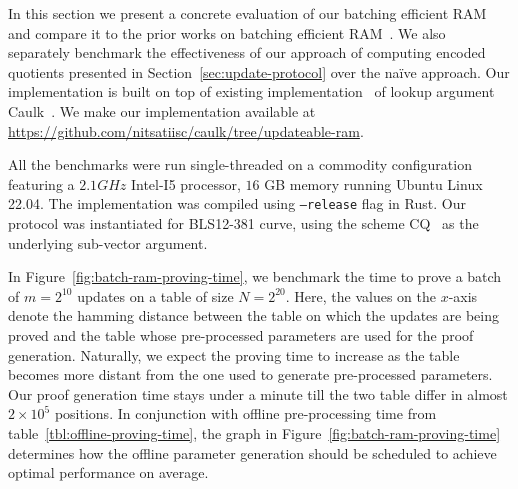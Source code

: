 In this section we present a concrete evaluation of our batching efficient RAM and compare it to the
prior works on batching efficient RAM~\cite{USENIX:OWWB20,CCS:CFHKKO22}.
We also separately benchmark the effectiveness of our approach of computing encoded quotients presented
in Section~\ref{sec:update-protocol} over the na\"{i}ve approach.
Our implementation is built on top of existing implementation~\cite{caulk-implementation}
of lookup argument Caulk~\cite{CCS:ZBKMNS22}. We make our implementation available at
\url{https://github.com/nitsatiisc/caulk/tree/updateable-ram}. 

\smallskip

 All the benchmarks were run single-threaded on a commodity configuration featuring a
$2.1GHz$ Intel-I5 processor, $16$ GB memory running Ubuntu Linux 22.04. The implementation was compiled using {\tt --release}
flag in Rust. Our protocol was instantiated for BLS12-381 curve, using the scheme CQ~\cite{EPRINT:EagFioGab22}
as the underlying sub-vector argument.

\smallskip

 In Figure~\ref{fig:batch-ram-proving-time}, we benchmark the time
to prove a batch of $m=2^{10}$ updates on a table of size $N=2^{20}$. Here, the values on the $x$-axis denote
the hamming distance between the table on which the updates are being proved and the table whose pre-processed
parameters are used for the proof generation. Naturally, we expect the proving time to increase as the table
becomes more distant from the one used to generate pre-processed parameters. Our proof generation time stays
under a minute till the two table differ in almost $2\times 10^5$ positions. In conjunction with offline
pre-processing time from table~\ref{tbl:offline-proving-time}, the graph in Figure~\ref{fig:batch-ram-proving-time}
determines how the offline parameter generation should be scheduled to achieve optimal performance on average.

